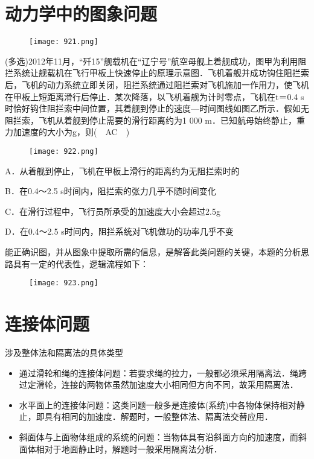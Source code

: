 \documentclass[cn,11pt]{elegantbook}
\begin{document}
\section{动力学中的图象问题}
\begin{figure}[htbp]
   \centering
   \texttt{[image: 921.png]}
\end{figure}

\begin{example}
   (多选)2012年11月，“歼15”舰载机在“辽宁号”航空母舰上着舰成功，图甲为利用阻拦系统让舰载机在飞行甲板上快速停止的原理示意图．飞机着舰并成功钩住阻拦索后，飞机的动力系统立即关闭，阻拦系统通过阻拦索对飞机施加一作用力，使飞机在甲板上短距离滑行后停止．某次降落，以飞机着舰为计时零点，飞机在t＝0.4 s时恰好钩住阻拦索中间位置，其着舰到停止的速度—时间图线如图乙所示．假如无阻拦索，飞机从着舰到停止需要的滑行距离约为1 000 m．已知航母始终静止，重力加速度的大小为g，则(　AC　)

   \begin{figure}[htbp]
      \centering
      \texttt{[image: 922.png]}
   \end{figure}
   A．从着舰到停止，飞机在甲板上滑行的距离约为无阻拦索时的
   
   B．在0.4～2.5 s时间内，阻拦索的张力几乎不随时间变化

   C．在滑行过程中，飞行员所承受的加速度大小会超过2.5g

   D．在0.4～2.5 s时间内，阻拦系统对飞机做功的功率几乎不变
   \begin{solution}
   能正确识图，并从图象中提取所需的信息，是解答此类问题的关键，本题的分析思路具有一定的代表性，逻辑流程如下：
   \begin{figure}[htbp]
      \centering
      \texttt{[image: 923.png]}
   \end{figure}


   \end{solution}
\end{example}



\section{连接体问题}
\begin{note}
   涉及整体法和隔离法的具体类型
   \begin{itemize}
      \item 通过滑轮和绳的连接体问题：若要求绳的拉力，一般都必须采用隔离法．绳跨过定滑轮，连接的两物体虽然加速度大小相同但方向不同，故采用隔离法．
      \item 水平面上的连接体问题：这类问题一般多是连接体(系统)中各物体保持相对静止，即具有相同的加速度．解题时，一般整体法、隔离法交替应用．
      \item 斜面体与上面物体组成的系统的问题：当物体具有沿斜面方向的加速度，而斜面体相对于地面静止时，解题时一般采用隔离法分析．
   \end{itemize}
   
\end{note}
\end{document}
